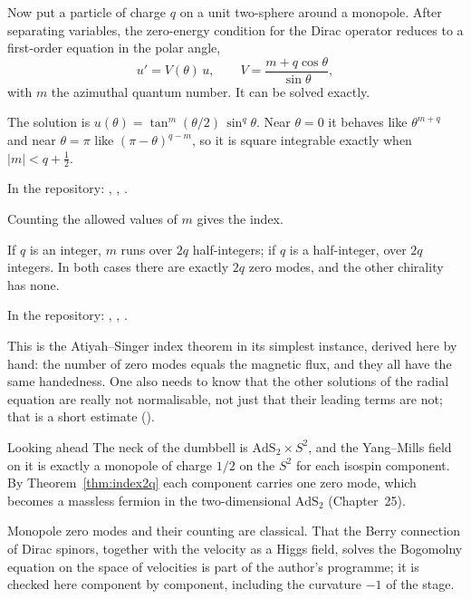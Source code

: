 Now put a particle of charge $q$ on a unit two-sphere around a monopole. After separating variables, the zero-energy condition for the Dirac operator reduces to a first-order equation in the polar angle,
\[
u'=V(\theta)\,u,\qquad V=\frac{m+q\cos\theta}{\sin\theta},
\]
with $m$ the azimuthal quantum number. It can be solved exactly.

\begin{proposition}\proved
The solution is $u(\theta)=\tan^m(\theta/2)\,\sin^q\theta$. Near $\theta=0$ it behaves like $\theta^{m+q}$ and near $\theta=\pi$ like $(\pi-\theta)^{q-m}$, so it is square integrable exactly when $|m|<q+\tfrac12$.
\end{proposition}
\noindent In the repository: , , .

Counting the allowed values of $m$ gives the index.

\begin{theorem}\proved\label{thm:index2q}
If $q$ is an integer, $m$ runs over $2q$ half-integers; if $q$ is a half-integer, over $2q$ integers. In both cases there are exactly $2q$ zero modes, and the other chirality has none.
\end{theorem}
\noindent In the repository: , , .

This is the Atiyah--Singer index theorem in its simplest instance, derived here by hand: the number of zero modes equals the magnetic flux, and they all have the same handedness. One also needs to know that the other solutions of the radial equation are really not normalisable, not just that their leading terms are not; that is a short estimate ().

\begin{asidebox}{Looking ahead}
The neck of the dumbbell is $\mathrm{AdS}_2\times S^2$, and the Yang--Mills field on it is exactly a monopole of charge $1/2$ on the $S^2$ for each isospin component. By Theorem~\ref{thm:index2q} each component carries one zero mode, which becomes a massless fermion in the two-dimensional $\mathrm{AdS}_2$ (Chapter~25).
\end{asidebox}

\begin{standsbox}
Monopole zero modes and their counting are classical. That the Berry connection of Dirac spinors, together with the velocity as a Higgs field, solves the Bogomolny equation on the space of velocities is part of the author's programme; it is checked here component by component, including the curvature $-1$ of the stage.
\end{standsbox}

